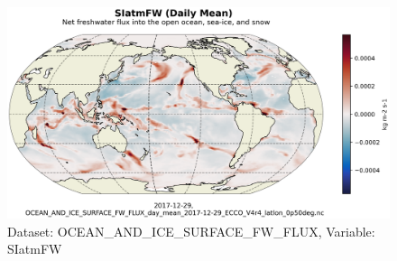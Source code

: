 \begin{figure}[H]
\centering
\includegraphics[scale=0.55]{../images/plots/latlon_plots/Ocean_and_Sea-Ice_Surface_Freshwater_Fluxes/SIatmFW.png}
\caption{Dataset: OCEAN\_AND\_ICE\_SURFACE\_FW\_FLUX, Variable: SIatmFW}
\label{tab:table-OCEAN_AND_ICE_SURFACE_FW_FLUX_SIatmFW-Plot}
\end{figure}
\pagebreak
